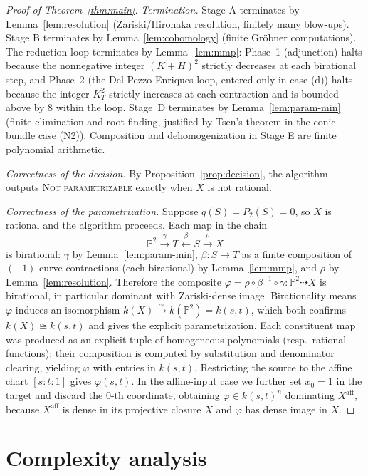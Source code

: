 \documentclass{amsart}
\theoremstyle{plain}
\theoremstyle{definition}
\newcommand{\PP}{\mathbb{P}}
\begin{document}
\begin{proof}[Proof of Theorem~\ref{thm:main}]
\emph{Termination.}  Stage A terminates by Lemma~\ref{lem:resolution}
(Zariski/Hironaka resolution, finitely many blow-ups).  Stage B terminates by
Lemma~\ref{lem:cohomology} (finite Gr\"obner computations).  The reduction
loop terminates by Lemma~\ref{lem:mmp}: Phase~1 (adjunction) halts because the
nonnegative integer $(K+H)^2$ strictly decreases at each birational step, and
Phase~2 (the Del Pezzo Enriques loop, entered only in case (d)) halts because the
integer $K_T^2$ strictly increases at each contraction and is bounded above by
$8$ within the loop.  Stage~D terminates by Lemma~\ref{lem:param-min} (finite
elimination and root finding, justified by Tsen's theorem in the conic-bundle
case (N2)).  Composition and dehomogenization in Stage E are finite polynomial
arithmetic.

\emph{Correctness of the decision.}  By Proposition~\ref{prop:decision}, the
algorithm outputs \textsc{Not parametrizable} exactly when $X$ is not rational.

\emph{Correctness of the parametrization.}  Suppose $q(S)=P_2(S)=0$, so $X$ is
rational and the algorithm proceeds.  Each map in the chain
\[
\PP^2 \xrightarrow{\ \gamma\ } T
\xleftarrow{\ \beta\ } S \xrightarrow{\ \rho\ } X
\]
is birational: $\gamma$ by Lemma~\ref{lem:param-min}, $\beta\colon S\to T$ as a
finite composition of $(-1)$-curve contractions (each birational) by
Lemma~\ref{lem:mmp}, and $\rho$ by Lemma~\ref{lem:resolution}.  Therefore the composite
$\varphi=\rho\circ\beta^{-1}\circ\gamma\colon\PP^2\dashrightarrow X$ is
birational, in particular dominant with Zariski-dense image.  Birationality
means $\varphi$ induces an isomorphism $k(X)\xrightarrow{\sim}k(\PP^2)=k(s,t)$,
which both confirms $k(X)\cong k(s,t)$ and gives the explicit parametrization.
Each constituent map was produced as an explicit tuple of homogeneous
polynomials (resp.\ rational functions); their composition is computed by
substitution and denominator clearing, yielding $\varphi$ with entries in
$k(s,t)$.  Restricting the source to the affine chart $[s:t:1]$ gives
$\varphi(s,t)$.  In the affine-input case we further set $x_0=1$ in the target
and discard the $0$-th coordinate, obtaining $\varphi\in k(s,t)^n$ dominating
$X^{\mathrm{aff}}$, because $X^{\mathrm{aff}}$ is dense in its projective closure
$X$ and $\varphi$ has dense image in $X$.
\end{proof}

\section{Complexity analysis}
\end{document}

